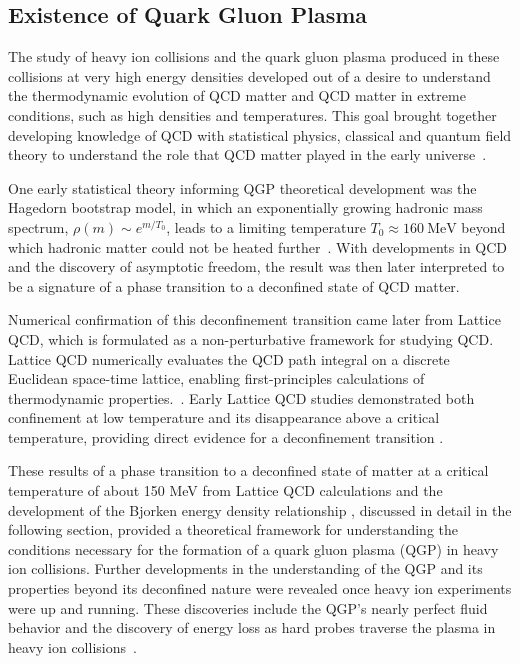 \subsection{Existence of Quark Gluon Plasma}
The study of heavy ion collisions and the quark gluon plasma produced in these collisions at very high energy densities developed out of a desire to understand the thermodynamic evolution of QCD matter and QCD matter in extreme conditions, such as high densities and temperatures.
This goal brought together developing knowledge of QCD with statistical physics, classical and quantum field theory to understand the role that QCD matter played in the early universe~\cite{Busza:2025early_history_qgp}.
 
One early statistical theory informing QGP theoretical development was the Hagedorn bootstrap model, in which an exponentially growing hadronic mass spectrum, $\rho(m) \sim e^{m/T_0}$, leads to a limiting temperature $T_0 \approx 160~\mathrm{MeV}$ beyond which hadronic matter could not be heated further~\cite{Hagedorn1965}. 
With developments in QCD and the discovery of asymptotic freedom, the result was then later interpreted to be a signature of a phase transition to a deconfined state of QCD matter. 

Numerical confirmation of this deconfinement transition came later from Lattice QCD, which is formulated as a non-perturbative framework for studying QCD.
Lattice QCD numerically evaluates the QCD path integral on a discrete Euclidean space-time lattice, enabling first-principles calculations of thermodynamic properties.~\cite{Wilson1974}. 
Early Lattice QCD studies demonstrated both confinement at low temperature and its disappearance above a critical temperature, providing direct evidence for a deconfinement transition \cite{Creutz1980,McLerranSvetitsky1981}.

These results of a phase transition to a deconfined state of matter at a critical temperature of about 150 MeV from Lattice QCD calculations \cite{Aoki:2006we} and the development of the Bjorken energy density relationship \cite{bjorken_energy_density}, discussed in detail in the following section, provided a theoretical framework for understanding the conditions necessary for the formation of a quark gluon plasma (QGP) in heavy ion collisions.
Further developments in the understanding of the QGP and its properties beyond its deconfined nature were revealed once heavy ion experiments were up and running. 
These discoveries include the QGP's nearly perfect fluid behavior and the discovery of energy loss as hard probes traverse the plasma in heavy ion collisions~\cite{PHENIX_white_paper,STAR_white_paper,PHOBOS_white_paper,BRAHMS_white_paper}.

